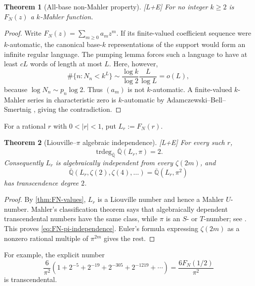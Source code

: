 \documentclass[11pt]{article}
\newtheorem{theorem}{Theorem}[section]
\theoremstyle{definition}
\theoremstyle{remark}
\newcommand{\status}[1]{\textnormal{\textcolor{accent}{\footnotesize[#1]}}}
\begin{document}
\begin{theorem}[All-base non-Mahler property]\label{thm:FN-non-Mahler}
\status{L+E}
For no integer $k\ge2$ is $F_N(z)$ a $k$-Mahler function.
\end{theorem}

\begin{proof}
Write $F_N(z)=\sum_{m\ge0}a_mz^m$.  If its finite-valued coefficient sequence were
$k$-automatic, the canonical base-$k$ representations of the support would form an
infinite regular language.  The pumping lemma forces such a language to have at least
$cL$ words of length at most $L$.  Here, however,
\begin{equation}\label{eq:FN-support-count}
 \#\{n:N_n<k^L\}
 \sim\frac{\log k}{\log2}\frac{L}{\log L}=o(L),
\end{equation}
because $\log N_n\sim p_n\log2$.  Thus $(a_m)$ is not $k$-automatic.  A
finite-valued $k$-Mahler series in characteristic zero is $k$-automatic by
Adamczewski--Bell--Smertnig \cite[Theorem~11.1]{AdamczewskiBellSmertnig}, giving the
contradiction.
\end{proof}

For a rational $r$ with $0<|r|<1$, put $L_r:=F_N(r)$.

\begin{theorem}[Liouville--$\pi$ algebraic independence]
\label{thm:FN-pi-independence}
\status{L+E}
For every such $r$,
\begin{equation}\label{eq:FN-pi-independence}
 \operatorname{trdeg}_{\overline{\mathbb Q}}
 \overline{\mathbb Q}(L_r,\pi)=2.
\end{equation}
Consequently $L_r$ is algebraically independent from every $\zeta(2m)$, and
\[
 \overline{\mathbb Q}(L_r,\zeta(2),\zeta(4),\ldots)
 =\overline{\mathbb Q}(L_r,\pi^2)
\]
has transcendence degree $2$.
\end{theorem}

\begin{proof}
By \cref{thm:FN-values}, $L_r$ is a Liouville number and hence a Mahler
$U$-number.  Mahler's classification theorem says that algebraically dependent
transcendental numbers have the same class, while $\pi$ is an $S$- or $T$-number;
see \cite[Theorems~2.3 and~2.5]{ChalebgwaMorris}.  This proves
\eqref{eq:FN-pi-independence}.  Euler's formula expressing $\zeta(2m)$ as a nonzero
rational multiple of $\pi^{2m}$ gives the rest.
\end{proof}

For example, the explicit number
\begin{equation}\label{eq:explicit-FN-pi-number}
 \frac6{\pi^2}\left(
 1+2^{-5}+2^{-19}+2^{-305}+2^{-1219}+\cdots\right)
 =\frac{6F_N(1/2)}{\pi^2}
\end{equation}
is transcendental.
\end{document}
